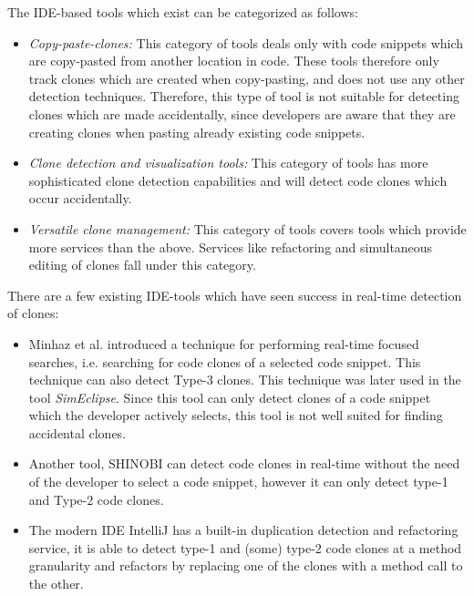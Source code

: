 \documentclass[12pt]{article}
\begin{document}
The IDE-based tools which exist can be categorized as
follows\cite[8]{Udding_Towards_Convenient_Management}:

\begin{itemize}
	\item\textit{Copy-paste-clones:} This category of tools deals only with code snippets which are
	copy-pasted from another location in code. These tools therefore only track clones which
	are created when copy-pasting, and does not use any other detection techniques. Therefore,
	this type of tool is not suitable for detecting clones which are made accidentally, since
	developers are aware that they are creating clones when pasting already existing code
	snippets.

	\item\textit{Clone detection and visualization tools:} This category of tools has more
	sophisticated clone detection capabilities and will detect code clones which occur
	accidentally.

	\item\textit{Versatile clone management:} This category of tools covers tools which provide more
	services than the above. Services like refactoring and simultaneous editing of clones fall
	under this category.
\end{itemize}

There are a few existing IDE-tools which have seen success in real-time detection of clones:

\begin{itemize}
	\item Minhaz et al. introduced a technique for performing real-time focused
	      searches, i.e. searching for code clones of a selected code snippet. This
	      technique can also detect Type-3 clones\cite{Zibran_real_time_search}.
	      This technique was later used in the tool
	      \textit{SimEclipse}\cite{Udding_Towards_Convenient_Management}. Since this tool
	      can only detect clones of a code snippet which the developer actively selects, this tool is
	      not well suited for finding accidental clones.

	\item Another tool, SHINOBI can detect code clones in real-time without the need
	      of the developer to select a code snippet, however it can only detect type-1
	      and Type-2 code clones\cite{SHINOBI}.

	\item The modern IDE IntelliJ has a built-in duplication detection and
          refactoring service, it is able to detect type-1 and (some) type-2 code clones
          at a method granularity and refactors by replacing one of the clones with a
          method call to the other.
\end{itemize}
\end{document}
